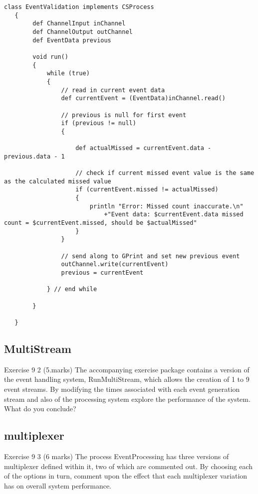 \documentclass[10pt, a4paper]{article}
\begin{document}
   \begin{lstlisting}[caption = "EventValidation.groovy" \label{lst:event}]
   class EventValidation implements CSProcess
   {
   	  	def ChannelInput inChannel
      	def ChannelOutput outChannel
      	def EventData previous
   
   	  	void run()
   	  	{
   	    	while (true)
   		 	{
   				// read in current event data
 				def currentEvent = (EventData)inChannel.read()
   
   				// previous is null for first event
   				if (previous != null)
   	 			{
   
   		 			def actualMissed = currentEvent.data - previous.data - 1
   
   					// check if current missed event value is the same as the calculated missed value
	   				if (currentEvent.missed != actualMissed)
   					{
   						println "Error: Missed count inaccurate.\n"
   							+"Event data: $currentEvent.data missed count = $currentEvent.missed, should be $actualMissed"
   					}
   				}
   
   				// send along to GPrint and set new previous event
   				outChannel.write(currentEvent)
   				previous = currentEvent	
   								
  			} // end while
   
   		}
   
   }   \end{lstlisting}
   \subsection{MultiStream}
   Exercise 9 2   (5.marks)
   The accompanying exercise package contains a version of the event handling system, RunMultiStream, which allows the creation of 1 to 9 event streams.  By modifying the times associated with each event generation stream and also of the processing system explore the performance of the system.  What do you conclude?
   

   
   \subsection{multiplexer}
   
   Exercise 9 3   (6 marks)
   The process EventProcessing has three versions of multiplexer defined within it, two of which are commented out.  By choosing each of the options in turn, comment upon the effect that each multiplexer variation has on overall system performance.
   
\end{document}
